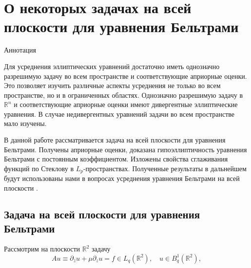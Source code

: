 \chapter{О некоторых задачах на всей плоскости для уравнения Бельтрами}


\begin{center} Аннотация
\end{center}
Для усреднения эллиптических уравнений достаточно иметь однозначно разрешимую задачу во всем пространстве и соответствующие априорные оценки. Это позволяет изучить различные  аспекты усреднения не только во всем пространстве, но и в ограниченных областях. Однозначно разрешимую задачу в $\mathbb{R}^n$ и соответствующие априорные оценки имеют дивергентные эллиптические уравнения. В случае недивергентных уравнений задачи во всем пространстве мало изучены. 

В данной работе рассматривается задача на всей плоскости для уравнения Бельтрами. Получены априорные оценки, доказана гипоэллиптичность уравнения Бельтрами с постоянным коэффициентом. Изложены свойства сглаживания функций по Стеклову в $L_p$-пространствах. Полученные результаты в дальнейшем будут использованы нами в вопросах усреднения уравнения Бельтрами на всей плоскости .



\section{Задача на всей плоскости для уравнения Бельтрами}
	
Рассмотрим на плоскости $\mathbb{R}^2$ задачу
\begin{equation}\label{eq:smm-1}
  Au\equiv\partial_{\bar{z}}u+\mu\partial_z u=f\in L_q (\mathbb{R}^2),\quad u\in B_q^1 (\mathbb{R}^2),
\end{equation}
                                
